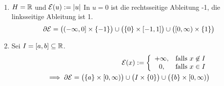 \begin{beispiel}\
\begin{enumerate}[label=(\arabic*)]
\item $H=\mathbb{R}$ und $\mathcal{E}(u):=|u|$
In $u=0$ ist die rechtsseitige Ableitung -1, die linksseitige Ableitung ist 1.
\begin{align*}
\partial\mathcal{E}=\big((-\infty,0]\times\lbrace-1\rbrace\big)\cup\big(\lbrace0\rbrace\times[-1,1]\big)\cup\big([0,\infty)\times\lbrace1\rbrace\big)
\end{align*}
\item Sei $I=[a,b]\subseteq\mathbb{R}$.
\begin{align*}
\mathcal{E}(x):=\left\lbrace\begin{array}{cl}
+\infty, &\text{falls } x\not\in I\\
0, &\text{falls } x\in I
\end{array}\right.\\
\implies
\partial\mathcal{E}=\big(\lbrace a\rbrace\times[0,\infty)\big)\cup \big(I\times\lbrace 0\rbrace\big)\cup\big(\lbrace b\rbrace\times[0,\infty)\big)
\end{align*}
\end{enumerate}
\end{beispiel}


